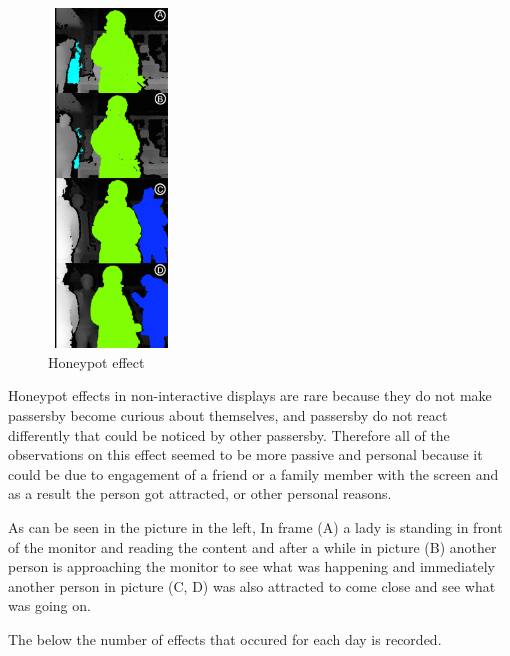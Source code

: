 \begin{figure}
  \vspace{-20pt}
  \begin{center}
    \includegraphics[width=0.30\textwidth,height=90mm]{figures/8/non_inter_findings/effects/honeypot}
  \end{center}
  \vspace{-20pt}
  \caption{Honeypot effect}
  \vspace{-60pt}
\end{figure}
Honeypot\cite{LookingGlass} effects in non-interactive displays are rare because they do not make passersby become curious about themselves, and passersby do not react differently that could be noticed by other passersby. Therefore all of the observations on this effect seemed to be more passive and personal because it could be due to engagement of a friend or a family member with the screen and as a result the person got attracted, or other personal reasons.

As can be seen in the picture in the left, In frame (A) a lady is standing in front of the monitor and reading the content and after a while in picture (B) another person is approaching the monitor to see what was happening and immediately another person in picture (C, D) was also attracted to come close and see what was going on. 


The below the number of effects that occured for each day is recorded.

